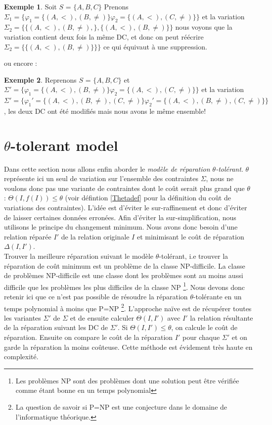 \documentclass[letterpaper, 12pt]{report}
\theoremstyle{definition}
\newtheorem{myexample}{Exemple}
\begin{document}
\begin{myexample}
Soit $S$ = $\{A,B,C\}$
Prenons $\Sigma_1 = \{ \varphi_1= \{(A,<),(B,\neq) \} \varphi_2= \{(A,<),(C,\neq) \}\}$ et la variation $ \Sigma_2 = \{ \{(A,<),(B,\neq), \} ,\{(A,<),(B,\neq) \}\}$
nous voyons que la variation contient deux fois la même DC, et donc on peut réécrire $ \Sigma_2 = \{ \{(A,<),(B,\neq) \}\}\}$ ce qui équivaut à une suppression.

\end{myexample}

ou encore :

\begin{myexample}

Reprenons $S$ = $\{A,B,C\}$
et $\Sigma' = \{ \varphi_1= \{(A,<),(B,\neq) \} \varphi_2= \{(A,<),(C,\neq) \}\}$ et la variation $\Sigma' = \{ \varphi_1'= \{(A,<),(B,\neq),(C,\neq) \} \varphi_2'= \{(A,<),(B,\neq),(C,\neq) \}\}$ , les deux DC ont été modifiés mais nous avons le même ensemble!
\end{myexample}
\section{$\theta$-tolerant model}

Dans cette section nous allons enfin aborder le \emph{modèle de réparation $\theta$-tolérant}. $\theta$ représente ici un seul de variation sur l'ensemble des contraintes $\Sigma$, nous ne voulons donc pas une variante de contraintes dont le coût serait plus grand que $\theta$ : $\Theta(I,f(I)) \leq \theta$ (voir défintion \ref{Thetadef} pour la définition du coût de variations des contraintes). L'idée est d'éviter le sur-raffinement et donc d'éviter de laisser certaines données erronées. Afin d'éviter la sur-simplification, nous utilisons le principe du changement minimum. Nous avons donc besoin d'une relation réparée $I'$ de la relation originale $I$ et minimisant le coût de réparation $\Delta(I,I')$.\\

Trouver la meilleure réparation suivant le modèle $\theta$-tolérant, i.e trouver la réparation de coût minimum est un problème de la classe NP-difficile. La classe de problèmes NP-difficile est une classe dont les problèmes sont au moins aussi difficile que les problèmes les plus difficiles de la classe NP \footnote{Les problèmes NP sont des problèmes dont une solution peut être vérifiée comme étant bonne en un temps polynomial}. Nous devons donc retenir ici que ce n'est pas possible de résoudre la réparation $\theta$-tolérante en un temps polynomial à moins que P=NP \footnote{La question de savoir si P=NP est une conjecture dans le domaine de l'informatique théorique.}. L'approche naïve est de récupérer toutes les variantes $\Sigma'$ de $\Sigma$ et de ensuite calculer $\Theta(I,I')$  avec $I'$ la relation résultante de la réparation suivant les DC de $\Sigma'$. Si $\Theta(I,I') \leq \theta$, on calcule le coût de réparation. Ensuite on compare le coût de la réparation $I'$ pour chaque $\Sigma'$ et on garde la réparation la moins coûteuse. Cette méthode est évidement très haute en complexité.\\
\end{document}

